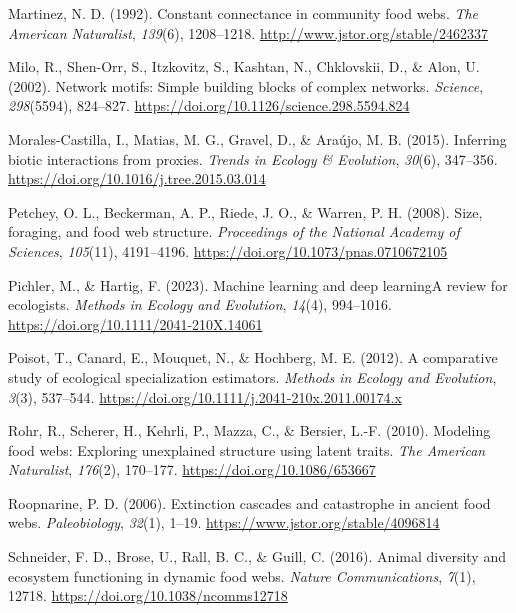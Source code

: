 \documentclass[
]{article}
\newlength{\cslhangindent}
\newenvironment{CSLReferences}[2] %
 {\begin{list}{}{%
  \setlength{\itemindent}{0pt}
  \setlength{\leftmargin}{0pt}
  \setlength{\parsep}{0pt}
  \ifodd #1
   \setlength{\leftmargin}{\cslhangindent}
   \setlength{\itemindent}{-1\cslhangindent}
  \fi
  \setlength{\itemsep}{#2\baselineskip}}}
 {\end{list}}
\begin{document}
\begin{CSLReferences}{1}{0}
Martinez, N. D. (1992). Constant connectance in community food webs.
\emph{The American Naturalist}, \emph{139}(6), 1208--1218.
\url{http://www.jstor.org/stable/2462337}

Milo, R., Shen-Orr, S., Itzkovitz, S., Kashtan, N., Chklovskii, D., \&
Alon, U. (2002). Network motifs: Simple building blocks of complex
networks. \emph{Science}, \emph{298}(5594), 824--827.
\url{https://doi.org/10.1126/science.298.5594.824}

Morales-Castilla, I., Matias, M. G., Gravel, D., \& Araújo, M. B.
(2015). Inferring biotic interactions from proxies. \emph{Trends in
Ecology \& Evolution}, \emph{30}(6), 347--356.
\url{https://doi.org/10.1016/j.tree.2015.03.014}

Petchey, O. L., Beckerman, A. P., Riede, J. O., \& Warren, P. H. (2008).
Size, foraging, and food web structure. \emph{Proceedings of the
National Academy of Sciences}, \emph{105}(11), 4191--4196.
\url{https://doi.org/10.1073/pnas.0710672105}

Pichler, M., \& Hartig, F. (2023). Machine learning and deep
learning{\textemdash}A review for ecologists. \emph{Methods in Ecology
and Evolution}, \emph{14}(4), 994--1016.
\url{https://doi.org/10.1111/2041-210X.14061}

Poisot, T., Canard, E., Mouquet, N., \& Hochberg, M. E. (2012). A
comparative study of ecological specialization estimators. \emph{Methods
in Ecology and Evolution}, \emph{3}(3), 537--544.
\url{https://doi.org/10.1111/j.2041-210x.2011.00174.x}

Rohr, R., Scherer, H., Kehrli, P., Mazza, C., \& Bersier, L.-F. (2010).
Modeling food webs: Exploring unexplained structure using latent traits.
\emph{The American Naturalist}, \emph{176}(2), 170--177.
\url{https://doi.org/10.1086/653667}

Roopnarine, P. D. (2006). Extinction cascades and catastrophe in ancient
food webs. \emph{Paleobiology}, \emph{32}(1), 1--19.
\url{https://www.jstor.org/stable/4096814}

Schneider, F. D., Brose, U., Rall, B. C., \& Guill, C. (2016). Animal
diversity and ecosystem functioning in dynamic food webs. \emph{Nature
Communications}, \emph{7}(1), 12718.
\url{https://doi.org/10.1038/ncomms12718}


\end{CSLReferences}
\end{document}
